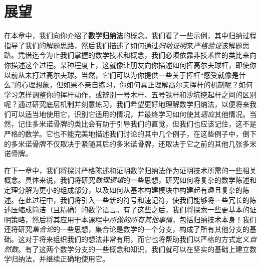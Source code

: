 \section{展望}

在本章中，我们向你介绍了\textbf{数学归纳法}的概念。我们看了一些示例，其中归纳过程指导了我们的解题思路，然后我们描述了如何通过\emph{归纳证明}来\emph{严格验证}该解题思路。凭借迄今为止我们掌握的数学技术和概念，我们必须依靠非技术性的类比来向你描述这个过程。某种程度上，这就像让朋友向你描述如何挥高尔夫球杆，即使你以前从未打过高尔夫球。当然，它们可以为你提供一些关于挥杆``感受就像是什么''的心理想象，但如果不亲自练习，你如何真正理解高尔夫挥杆的机制呢？如何学习怎样调整你的挥杆动作，或辨别一号木杆、五号铁杆和沙坑挖起杆之间的区别呢？通过研究底层机制并刻意练习，我们希望更好地理解数学归纳法，以便将来我们可以适当地使用它，识别它适用的情况，并最终学习如何使其\emph{适应}其他情况。当然，记住多米诺骨牌的类比会有助于引导我们的直觉，但我们也应该记住，这不是严格的数学。它也不能完美地描述我们讨论的其中几个例子，在这些例子中，倒下的多米诺骨牌不仅取决于紧随其后的多米诺骨牌，还取决于它之前的其他几张多米诺骨牌。

在下一章中，我们将探讨严格陈述和证明数学归纳法作为证明技术所需的一些相关概念。具体来说，我们将研究\emph{数理逻辑}的一些思想，研究如何将复杂的数学陈述和定理分解为更小的组成部分，以及如何从基本构建模块中构建起有趣且复杂的陈述。在此过程中，我们将引入一些新的符号和速记符，使我们能够将一些冗长的陈述压缩成简洁（且精确）的数学语言。有了这些之后，我们将探索一些更基本的证明策略，然后将其应用于本课程中\emph{所做的所有其他事情}，包括归纳技术本身！我们还将研究\emph{集合论}的一些思想，集合论是数学的一个分支，构成了所有其他分支的基础。这对于将来组织我们的想法非常有用，而它也将帮助我们以严格的方式定义\emph{自然数}。有了这两个数学分支的一些概念和知识，我们就可以在坚实的基础上建立数学归纳法，并继续正确地使用它。